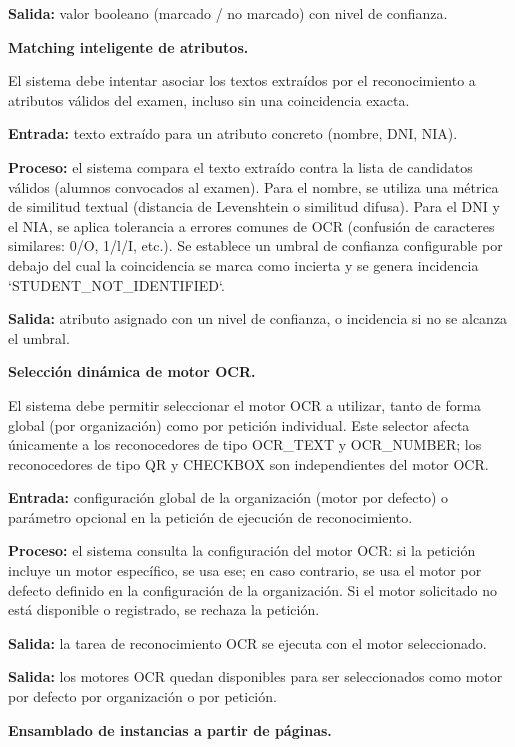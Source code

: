 \begin{functional}
\begin{functional}
    \textbf{Salida:} valor booleano (marcado / no marcado) con nivel de confianza.

    \item \textbf{Matching inteligente de atributos.}

    El sistema debe intentar asociar los textos extraídos por el reconocimiento a atributos válidos del examen, incluso sin una coincidencia exacta.

    \textbf{Entrada:} texto extraído para un atributo concreto (nombre, DNI, NIA).

    \textbf{Proceso:} el sistema compara el texto extraído contra la lista de candidatos válidos (alumnos convocados al examen). Para el nombre, se utiliza una métrica de similitud textual (distancia de Levenshtein o similitud difusa). Para el DNI y el NIA, se aplica tolerancia a errores comunes de OCR (confusión de caracteres similares: 0/O, 1/l/I, etc.). Se establece un umbral de confianza configurable por debajo del cual la coincidencia se marca como incierta y se genera incidencia `STUDENT\_NOT\_IDENTIFIED`.

    \textbf{Salida:} atributo asignado con un nivel de confianza, o incidencia si no se alcanza el umbral.

    \item \textbf{Selección dinámica de motor OCR.}

    El sistema debe permitir seleccionar el motor OCR a utilizar, tanto de forma global (por organización) como por petición individual. Este selector afecta únicamente a los reconocedores de tipo OCR\_TEXT y OCR\_NUMBER; los reconocedores de tipo QR y CHECKBOX son independientes del motor OCR.

    \textbf{Entrada:} configuración global de la organización (motor por defecto) o parámetro opcional en la petición de ejecución de reconocimiento.

    \textbf{Proceso:} el sistema consulta la configuración del motor OCR: si la petición incluye un motor específico, se usa ese; en caso contrario, se usa el motor por defecto definido en la configuración de la organización. Si el motor solicitado no está disponible o registrado, se rechaza la petición.

    \textbf{Salida:} la tarea de reconocimiento OCR se ejecuta con el motor seleccionado.


    \textbf{Salida:} los motores OCR quedan disponibles para ser seleccionados como motor por defecto por organización o por petición.

    \item \textbf{Ensamblado de instancias a partir de páginas.}


\end{functional}
\end{functional}
